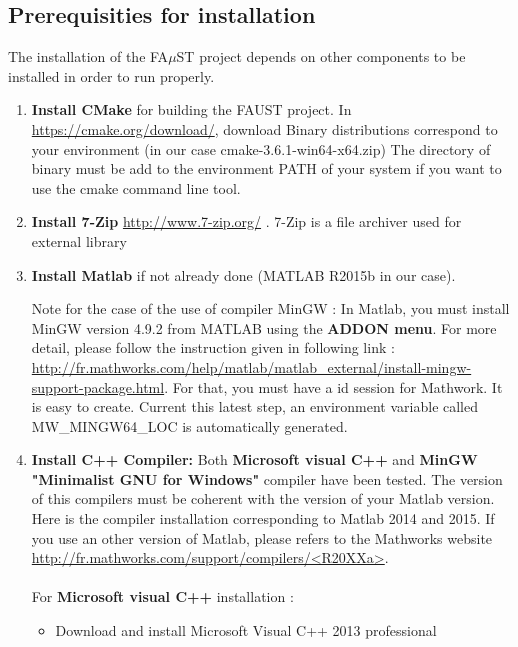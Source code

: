 \subsection{Prerequisities for installation}\label{sec:WinPrerequisitiesInstall}
The installation of the FA$\mu$ST project depends on other components to be installed in order to run properly. 
\begin{enumerate}

\item \textbf{Install CMake} for building the FAUST project. 
In \url{https://cmake.org/download/}, download Binary distributions correspond to your environment (in our case  cmake-3.6.1-win64-x64.zip)
The directory of binary must be add to the environment PATH of your system if you want to use the cmake command line tool. 

\item \textbf{Install 7-Zip} \url{http://www.7-zip.org/} . 7-Zip is a file archiver used for external library

\item \textbf{Install Matlab} if not already done (MATLAB R2015b in our case).

Note for the case of the use of compiler MinGW : In Matlab, you must install MinGW version 4.9.2 from MATLAB using the \textbf{ADDON menu}. For more detail, please follow the instruction given in following link :  
\url{http://fr.mathworks.com/help/matlab/matlab_external/install-mingw-support-package.html}. For that, you must have a id session for Mathwork. It is easy to create. 
Current this latest step, an environment variable called MW\_MINGW64\_LOC is automatically generated. 


\item \textbf{Install C++ Compiler:} Both \textbf{Microsoft visual C++} and \textbf{MinGW "Minimalist GNU for Windows"} compiler have been tested. The version of this compilers must be coherent with the version of your Matlab version. Here is the compiler installation corresponding to Matlab 2014 and 2015. If you use an other version of Matlab, please refers to the Mathworks website \url{http://fr.mathworks.com/support/compilers/<R20XXa>}.

\paragraph{}For \textbf{Microsoft visual C++} installation :
\begin{itemize}
\item Download and install Microsoft Visual C++ 2013 professional
\end{itemize}


\end{enumerate}
